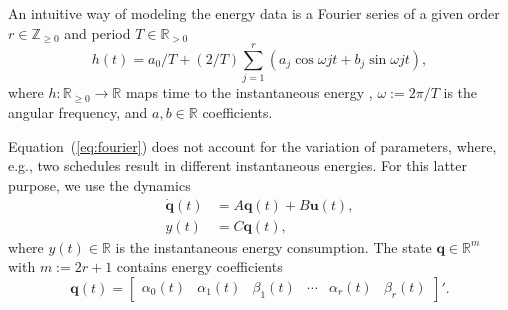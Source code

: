 \documentclass[letterpaper,10pt,journal,twoside]{IEEEtran}
\theoremstyle{definition}
\begin{document}



An intuitive way of modeling the energy data is a Fourier series of a given order $r\in\mathbb{Z}_{\geq 0}$ and period $T\in\mathbb{R}_{>0}$
\begin{equation}\label{eq:fourier}
  h(t)=a_0/T+(2/T)\sum_{j=1}^{r}{\left(a_j\cos{\omega jt}+b_j\sin{\omega jt}\right)},
\end{equation}
where $h:\mathbb{R}_{\geq 0}\rightarrow\mathbb{R}$ maps time to the instantaneous energy%
, $\omega:=2\pi/T$ is the angular frequency, and $a,b\in\mathbb{R}$ %
coefficients.

Equation~(\ref{eq:fourier}) does not account for the variation of parameters, where, e.g., two schedules result in different instantaneous energies.
For this latter purpose, we use the dynamics %
\begin{subequations}\label{eq:state-perf}
  \begin{align}
  \dot{\mathbf{q}}(t)&=A\mathbf{q}(t)+B\mathbf{u}(t),\label{eq:state-perf-q}\\
  y(t)&=C\mathbf{q}(t),\label{eq:state-perf-y}
\end{align}
\end{subequations}
where $y(t)\in\mathbb{R}$ is the instantaneous energy consumption. The state $\mathbf{q}\in\mathbb{R}^m$ with $m:=2r+1$ contains energy coefficients
\begin{equation}
  \mathbf{q}(t)=\begin{bmatrix}
    \alpha_0(t) & \alpha_1(t) & \beta_1(t) & \cdots & \alpha_r(t) & \beta_r(t)
  \end{bmatrix}'.
\end{equation}
\end{document}

